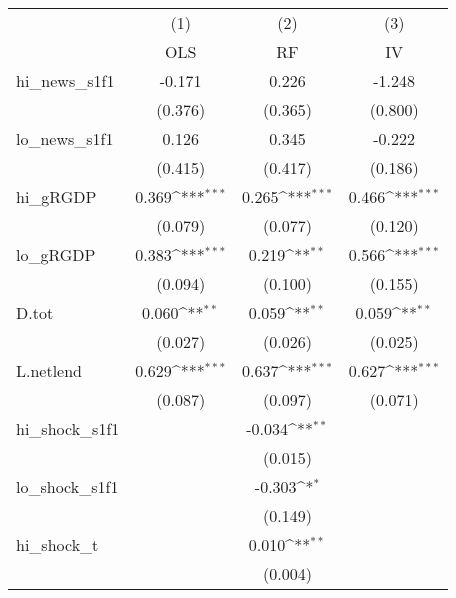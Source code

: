 {
\def\sym#1{\ifmmode^{#1}\else\(^{#1}\)\fi}
\begin{tabular}{l*{3}{c}}
\toprule
            &\multicolumn{1}{c}{(1)}&\multicolumn{1}{c}{(2)}&\multicolumn{1}{c}{(3)}\\
            &\multicolumn{1}{c}{OLS}&\multicolumn{1}{c}{RF}&\multicolumn{1}{c}{IV}\\
\midrule
hi\_news\_s1f1&      -0.171         &       0.226         &      -1.248         \\
            &     (0.376)         &     (0.365)         &     (0.800)         \\
\addlinespace
lo\_news\_s1f1&       0.126         &       0.345         &      -0.222         \\
            &     (0.415)         &     (0.417)         &     (0.186)         \\
\addlinespace
hi\_gRGDP    &       0.369\sym{***}&       0.265\sym{***}&       0.466\sym{***}\\
            &     (0.079)         &     (0.077)         &     (0.120)         \\
\addlinespace
lo\_gRGDP    &       0.383\sym{***}&       0.219\sym{**} &       0.566\sym{***}\\
            &     (0.094)         &     (0.100)         &     (0.155)         \\
\addlinespace
D.tot       &       0.060\sym{**} &       0.059\sym{**} &       0.059\sym{**} \\
            &     (0.027)         &     (0.026)         &     (0.025)         \\
\addlinespace
L.netlend   &       0.629\sym{***}&       0.637\sym{***}&       0.627\sym{***}\\
            &     (0.087)         &     (0.097)         &     (0.071)         \\
\addlinespace
hi\_shock\_s1f1&                     &      -0.034\sym{**} &                     \\
            &                     &     (0.015)         &                     \\
\addlinespace
lo\_shock\_s1f1&                     &      -0.303\sym{*}  &                     \\
            &                     &     (0.149)         &                     \\
\addlinespace
hi\_shock\_t  &                     &       0.010\sym{**} &                     \\
            &                     &     (0.004)         &                     \\

\end{tabular}}
